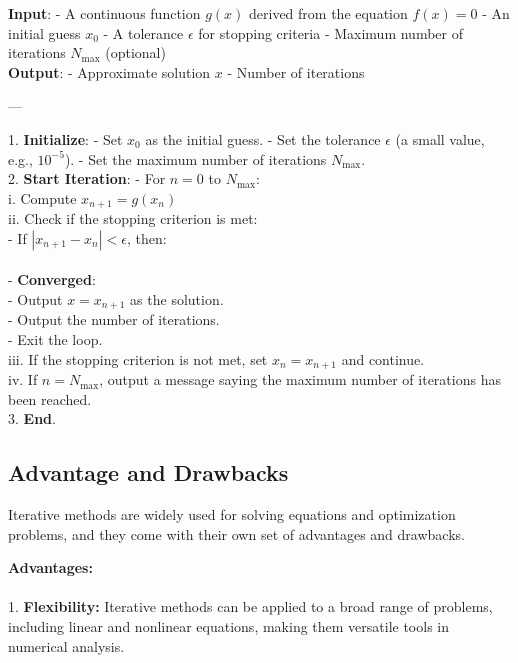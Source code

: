 \documentclass[12pt,a4paper]{article}
\begin{document}
	\textbf{Input}: 
	- A continuous function \( g(x) \) derived from the equation \( f(x) = 0 \)
	- An initial guess \( x_0 \)
	- A tolerance \( \epsilon \) for stopping criteria
	- Maximum number of iterations \( N_{\text{max}} \) (optional)\\
	
	\textbf{Output}: 
	- Approximate solution \( x \)
	- Number of iterations
	
	---
	
	1. \textbf{Initialize}:
	- Set \( x_0 \) as the initial guess.
	- Set the tolerance \( \epsilon \) (a small value, e.g., \( 10^{-5} \)).
	- Set the maximum number of iterations \( N_{\text{max}} \). \\
	
	2. \textbf{Start Iteration}:
	- For \( n = 0 \) to \( N_{\text{max}} \):\\
	i. Compute \( x_{n+1} = g(x_n) \)\\
	ii. Check if the stopping criterion is met:\\
	- If \( |x_{n+1} - x_n| < \epsilon \), then:\\ \\
	
	- \textbf{Converged}:\\
	- Output \( x = x_{n+1} \) as the solution.\\
	- Output the number of iterations.\\
	- Exit the loop.\\
	
	iii. If the stopping criterion is not met, set \( x_n = x_{n+1} \) and continue.\\
	
	iv. If \( n = N_{\text{max}} \), output a message saying the maximum number of iterations has been reached.\\
	
	3. \textbf{End}.
	

	
	
	\subsection{Advantage and Drawbacks}
	Iterative methods are widely used for solving equations and optimization problems, and they come with their own set of advantages and drawbacks.
	
	\textbf{Advantages:}\\ \\
	1. \textbf{Flexibility:} Iterative methods can be applied to a broad range of problems, including linear and nonlinear equations, making them versatile tools in numerical analysis.\\
	
\end{document}
